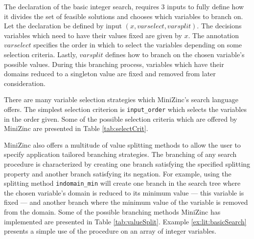 The declaration of the basic integer search, requires 3 inputs to fully
define how it divides the set of feasible solutions
and chooses which variables to branch on. Let the declaration be defined by input 
$(x,varselect,varsplit)$. The decisions variables which need to have 
their values fixed are given by $x$. The annotation $varselect$ specifies
the order in which to select the variables depending on some selection criteria.
Lastly, $varsplit$ defines how to branch on the chosen variable's 
possible values. During this branching process, variables which have their
domains reduced to a singleton value are fixed and removed from
later consideration.

There are many variable selection strategies which MiniZinc's search language
offers. The simplest selection criterion is {\tt input\_order} which selects
the variables in the order given.
Some of the possible selection criteria which
are offered by MiniZinc are presented in Table \ref{tab:selectCrit}.

MiniZinc also offers a multitude of value splitting methods to allow
the user to specify application tailored branching strategies.
The branching of any search procedure is characterized by
creating one branch satisfying the specified splitting
property and another branch satisfying its negation.
For example, using the splitting method {\tt indomain\_min}
will create one branch in the search tree where the chosen variable's
domain is reduced to its minimum value --- \ie this variable is fixed
--- and another branch where the minimum value of the variable
is removed from the domain.
Some of the possible branching methods MiniZinc
has implemented are presented in Table \ref{tab:valueSplit}.
Example \ref{ex:lit:basicSearch} presents a simple
use of the \intser procedure on an array of integer
variables.

